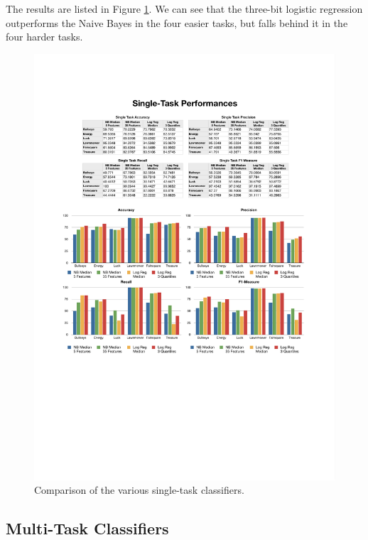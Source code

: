 The results are listed in Figure \ref{fig:singletask}. We can see that the three-bit logistic regression outperforms the Naive Bayes in the four easier tasks, but falls behind it in the four harder tasks.

%
\begin{figure}
    \centering
    \setlength{\tabcolsep}{0.0130\linewidth}
    \includegraphics[width=\linewidth]{figures/SingleTask}
    \caption{Comparison of the various single-task classifiers.%
      \label{fig:singletask}}
\end{figure}


\subsection{Multi-Task Classifiers}


